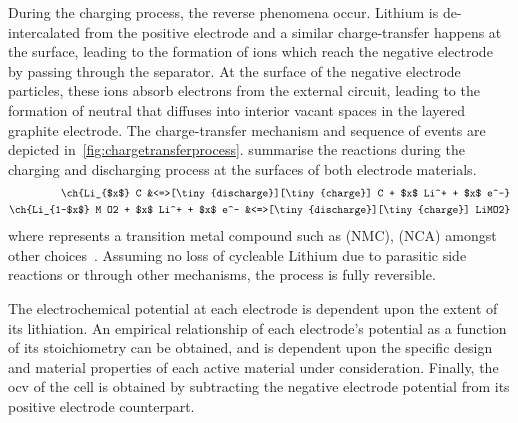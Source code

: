 During  the   charging  process,  the   reverse  phenomena  occur.   Lithium  is
de-intercalated  from  the  positive  electrode and  a  similar  charge-transfer
happens  at the  surface,  leading  to the  formation  of   ions  which
reach  the  negative  electrode  by   passing  through  the  separator.  At  the
surface  of  the  negative  electrode particles,  these  ions  absorb  electrons
from  the  external circuit,  leading  to  the  formation of  neutral  
that   diffuses  into   interior   vacant  spaces   in   the  layered   graphite
electrode. The  charge-transfer mechanism  and sequence  of events  are depicted
in~\cref{fig:chargetransferprocess}.
 summarise the reactions during the
charging and discharging process at the surfaces of both electrode materials.
\begin{align}
    \ch{Li_{$x$} C                            &<=>[\tiny{discharge}][\tiny{charge}] C + $x$ Li^+ + $x$ e^-}\label{eq:NegElectrodeRxn}\\
    \ch{Li_{1-$x$} M O2 + $x$ Li^+  + $x$ e^- &<=>[\tiny{discharge}][\tiny{charge}] LiMO2}\label{eq:PosElectrodeRxn}
\end{align}
where       represents    a    transition   metal    compound   such    as
   (NMC),      (NCA)
amongst other  choices~\cite{Reddy2011}. Assuming  no loss of  cycleable Lithium
due to  parasitic side  reactions or  through other  mechanisms, the  process is
fully reversible.


The electrochemical potential at each electrode  is dependent upon the extent of
its  lithiation. An  empirical  relationship of  each  electrode's potential  as
a  function  of  its  stoichiometry  can be  obtained,  and  is  dependent  upon
the  specific design  and  material  properties of  each  active material  under
consideration. Finally, the \gls{ocv} of the cell is obtained by subtracting the
negative electrode potential from its positive electrode counterpart.





